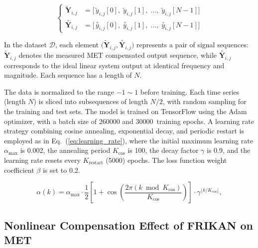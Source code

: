 \documentclass[journal]{IEEEtran}
\newcommand{\valInitLR}{0.002}
\newcommand{\valEpochs}{30000}
\newcommand{\fidx}{i} %
\newcommand{\midx}{j} %
\newcommand{\pmax}{N} %
\newcommand{\dataset}{{\mathcal{D}}} %
\newcommand{\yseq}{{\mathbf{Y}}} %
\newcommand{\wMAE}{\beta} %
\newcommand{\lr}{\alpha} %
\newcommand{\lrdecay}{\gamma} %
\newcommand{\lridx}{k} %
\newcommand{\lrperiod}{K} %
\newcommand{\ideal}[1]{\overset{\circ}{#1}} %
\newcommand{\exam}[1]{\tilde{#1}} %
\begin{document}
\begin{equation}
    \left\{
    \begin{aligned}
        \exam{\yseq}_{\fidx,\midx}  & =
        \bigl[
            \,\exam{y}_{\fidx,\midx}[0],\;
            \exam{y}_{\fidx,\midx}[1],\;
            \ldots,\;
            \exam{y}_{\fidx,\midx}[\pmax-1]
        \bigr]                          \\
        \ideal{\yseq}_{\fidx,\midx} & =
        \bigl[
            \,\ideal{y}_{\fidx,\midx}[0],\;
            \ideal{y}_{\fidx,\midx}[1],\;
            \ldots,\;
            \ideal{y}_{\fidx,\midx}[\pmax-1]
            \bigr]
    \end{aligned}
    \right.
    \label{eq:dataset_element}
\end{equation}

In the dataset $\dataset$, each element $\bigl(\exam{\yseq}_{\fidx,\midx}, \ideal{\yseq}_{\fidx,\midx}\bigr)$ represents a pair of signal sequences: 
    $\exam{\yseq}_{\fidx,\midx}$ denotes the measured MET compensated output sequence, while $\ideal{\yseq}_{\fidx,\midx}$ corresponds to the ideal linear system output at identical frequency and magnitude. Each sequence has a length of $\pmax$.

The data is normalized to the range $-1 \sim 1$ before training. Each time series (length $\pmax$) is sliced into subsequences of length $\pmax/2$, with random sampling for the training and test sets. The model is trained on TensorFlow using the Adam optimizer, with a batch size of 260000 and \valEpochs~training epochs. A learning rate strategy combining cosine annealing, exponential decay, and periodic restart is employed as in Eq.~(\ref{eq:learning_rate}), where the initial maximum learning rate $\lr_{\max}$ is \valInitLR, the annealing period $\lrperiod_{\text{cos}}$ is 100, the decay factor $\lrdecay$ is 0.9, and the learning rate resets every $\lrperiod_{\text{restart}}$ (5000) epochs. The loss function weight coefficient $\wMAE$ is set to 0.2.

\begin{equation}
    \lr(\lridx) =
    \lr_{\max} \cdot \frac{1}{2}\left[1 + \cos\left(\frac{2\pi (\lridx \bmod \lrperiod_{\text{cos}})}{\lrperiod_{\text{cos}}}\right)\right]
    \cdot \lrdecay^{\lfloor \lridx/\lrperiod_{\text{cos}} \rfloor},
    \label{eq:learning_rate}
\end{equation}


\subsection{Nonlinear Compensation Effect of FRIKAN on MET}
\end{document}

